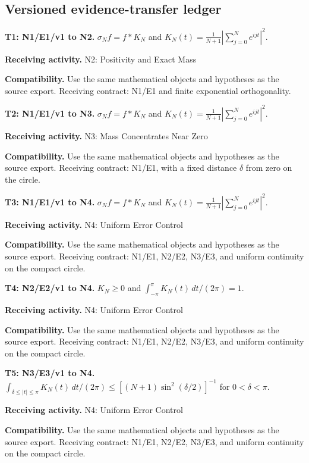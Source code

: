 \documentclass[preprint,12pt,aps,pra,showkeys,amsmath,amssymb,superscriptaddress,floatfix]{revtex4-2}
\theoremstyle{definition}
\theoremstyle{remark}
\newcommand{\field}[2]{\par\smallskip\noindent\textbf{#1.} #2\par}
\begin{document}
\clearpage\subsection{Versioned evidence-transfer ledger}

\begingroup\small\linespread{1.05}\selectfont

\field{T1: N1/E1/v1 to N2}{\(\sigma_N f=f*K_N\) and \(K_N(t)=\frac1{N+1}|\sum_{j=0}^N e^{ijt}|^2\).}

\field{Receiving activity}{N2: Positivity and Exact Mass}

\field{Compatibility}{Use the same mathematical objects and hypotheses as the source export.
Receiving contract: N1/E1 and finite exponential orthogonality.}

\field{T2: N1/E1/v1 to N3}{\(\sigma_N f=f*K_N\) and \(K_N(t)=\frac1{N+1}|\sum_{j=0}^N e^{ijt}|^2\).}

\field{Receiving activity}{N3: Mass Concentrates Near Zero}

\field{Compatibility}{Use the same mathematical objects and hypotheses as the source export.
Receiving contract: N1/E1, with a fixed distance \(\delta\) from zero on
the circle.}

\field{T3: N1/E1/v1 to N4}{\(\sigma_N f=f*K_N\) and \(K_N(t)=\frac1{N+1}|\sum_{j=0}^N e^{ijt}|^2\).}

\field{Receiving activity}{N4: Uniform Error Control}

\field{Compatibility}{Use the same mathematical objects and hypotheses as the source export.
Receiving contract: N1/E1, N2/E2, N3/E3, and uniform continuity on the
compact circle.}

\field{T4: N2/E2/v1 to N4}{\(K_N\ge0\) and \(\int_{-\pi}^{\pi}K_N(t)\,dt/(2\pi)=1\).}

\field{Receiving activity}{N4: Uniform Error Control}

\field{Compatibility}{Use the same mathematical objects and hypotheses as the source export.
Receiving contract: N1/E1, N2/E2, N3/E3, and uniform continuity on the
compact circle.}

\field{T5: N3/E3/v1 to N4}{\(\int_{\delta\le|t|\le\pi}K_N(t)\,dt/(2\pi)\le[(N+1)\sin^2(\delta/2)]^{-1}\)
for \(0<\delta<\pi\).}

\field{Receiving activity}{N4: Uniform Error Control}

\field{Compatibility}{Use the same mathematical objects and hypotheses as the source export.
Receiving contract: N1/E1, N2/E2, N3/E3, and uniform continuity on the
compact circle.}
\end{document}
